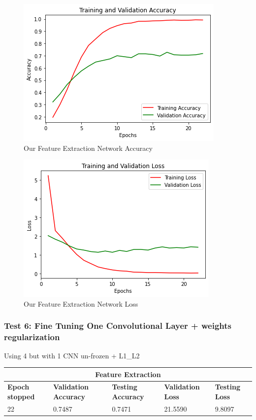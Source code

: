 \medskip

\begin{figure}[H]
	\centering
	\includegraphics[height=0.45\textwidth]{img/vgg16ft2dropacc.png}
	\caption{Our Feature Extraction Network Accuracy}
	\label{fig:vgg16ft2dropacc}
\end{figure}

\begin{figure}[H]
	\centering
	\includegraphics[height=0.45\textwidth]{img/vgg16ft2droploss.png}
	\caption{Our Feature Extraction Network Loss}
	\label{fig:vgg16ft2droploss}
\end{figure}








\subsubsection{Test 6: Fine Tuning One Convolutional Layer + weights regularization}
Using 4 but with 1 CNN un-frozen + L1\_L2



\medskip

\begin{tabular}{ |p{2cm}|p{2cm}|p{2cm}|p{2cm}|p{2cm}|  }
\hline
\multicolumn{5}{|c|}{Feature Extraction} \\
\hline
\textbf{Epoch stopped} & \textbf{Validation Accuracy} & \textbf{Testing Accuracy} & \textbf{Validation Loss} & \textbf{Testing Loss} \\
\hline
22& 0.7487 & 0.7471 & 21.5590 & 9.8097\\
\hline
\end{tabular}

